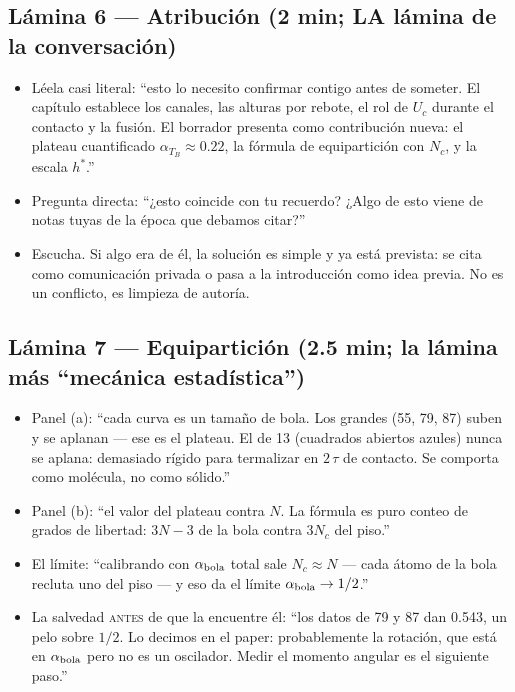 \documentclass[11pt,a4paper]{article}
\begin{document}
\subsection*{Lámina 6 --- Atribución (2 min; LA lámina de la conversación)}
\begin{itemize}[leftmargin=1.4em]
    \item Léela casi literal: ``esto lo necesito confirmar contigo antes
    de someter. El capítulo establece los canales, las alturas por
    rebote, el rol de $U_c$ durante el contacto y la fusión. El borrador
    presenta como contribución nueva: el plateau cuantificado
    $\alpha_{T_B}\approx0.22$, la fórmula de equipartición con $N_c$, y
    la escala $h^*$.''
    \item Pregunta directa: ``¿esto coincide con tu recuerdo? ¿Algo de
    esto viene de notas tuyas de la época que debamos citar?''
    \item Escucha. Si algo era de él, la solución es simple y ya está
    prevista: se cita como comunicación privada o pasa a la introducción
    como idea previa. No es un conflicto, es limpieza de autoría.
\end{itemize}

\subsection*{Lámina 7 --- Equipartición (2.5 min; la lámina más ``mecánica estadística'')}
\begin{itemize}[leftmargin=1.4em]
    \item Panel (a): ``cada curva es un tamaño de bola. Los grandes (55,
    79, 87) suben y se aplanan --- ese es el plateau. El de 13 (cuadrados
    abiertos azules) nunca se aplana: demasiado rígido para termalizar en
    $2\,\tau$ de contacto. Se comporta como molécula, no como sólido.''
    \item Panel (b): ``el valor del plateau contra $N$. La fórmula es
    puro conteo de grados de libertad: $3N-3$ de la bola contra $3N_c$
    del piso.''
    \item El límite: ``calibrando con $\alpha_{\rm bola}$ total sale
    $N_c\approx N$ --- cada átomo de la bola recluta uno del piso --- y
    eso da el límite $\alpha_{\rm bola}\to1/2$.''
    \item La salvedad \textsc{antes} de que la encuentre él: ``los datos
    de 79 y 87 dan 0.543, un pelo sobre $1/2$. Lo decimos en el paper:
    probablemente la rotación, que está en $\alpha_{\rm bola}$ pero no es
    un oscilador. Medir el momento angular es el siguiente paso.''
\end{itemize}
\end{document}
